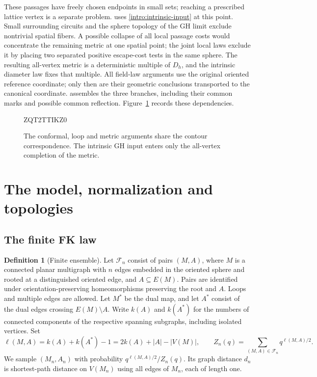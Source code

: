 \documentclass[11pt]{article}
\numberwithin{equation}{section}
\theoremstyle{definition}
\newtheorem{definition}[theorem]{Definition}
\theoremstyle{remark}
\newcommand{\1}{\mathbf 1}
\begin{document}
These passages have freely chosen endpoints in small sets; reaching
a prescribed lattice vertex is a separate problem.
 uses \cref{intro:intrinsic-input} at this point.
Small surrounding circuits and the sphere topology of the GH limit
exclude nontrivial spatial fibers. A possible collapse of all local
passage costs would concentrate the remaining metric at one spatial
point; the joint local laws exclude it by placing two separated
positive escape-cost tests in the same sphere. The resulting
all-vertex metric is a deterministic multiple of $D_h$, and the
intrinsic diameter law fixes that multiple. All field-law arguments
use the original oriented reference coordinate; only then are their
geometric conclusions transported to the canonical coordinate.
 assembles the three branches, including their
common marks and possible common reflection.
Figure~\ref{intro:roadmap-figure} records these dependencies.

\begin{figure}[ht]

ZQT2TTIKZ0
\caption{The conformal, loop and metric arguments share the contour
correspondence. The intrinsic GH input enters only the all-vertex
completion of the metric.}
\label{intro:roadmap-figure}
\end{figure}

\section{The model, normalization and topologies}\label{intro:model-section}

\subsection{The finite FK law}

\begin{definition}[Finite ensemble]\label{intro:finite-law}
Let $\mathcal F_n$ consist of pairs $(M,A)$, where $M$ is a connected
planar multigraph with $n$ edges embedded in the oriented sphere and
rooted at a distinguished oriented edge, and $A\subseteq E(M)$.
Pairs are identified under orientation-preserving homeomorphisms
preserving the root and $A$. Loops and multiple edges are allowed.
Let $M^*$ be the dual map, and let $A^*$ consist of the dual edges
crossing $E(M)\setminus A$. Write $k(A)$ and $k(A^*)$ for the numbers
of connected components of the respective spanning subgraphs,
including isolated vertices. Set
\[
 \ell(M,A)=k(A)+k(A^*)-1
         =2k(A)+|A|-|V(M)|,
 \qquad
 Z_n(q)=\sum_{(M,A)\in\mathcal F_n}q^{\ell(M,A)/2}.
\]
We sample $(M_n,A_n)$ with probability
$q^{\ell(M,A)/2}/Z_n(q)$. Its graph distance $d_n$ is shortest-path
distance on $V(M_n)$ using all edges of $M_n$, each of length one.
\end{definition}
\end{document}
